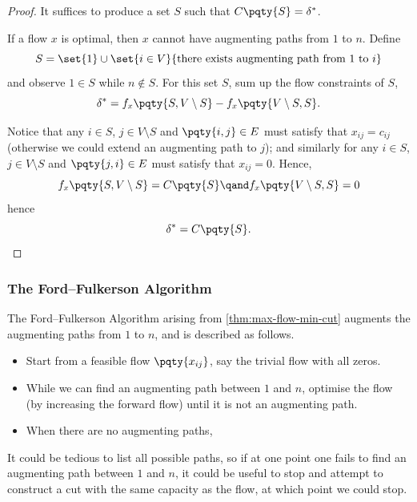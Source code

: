 \begin{proof}
    It suffices to produce a set \(S\) such that \(C\pqty{S} = \delta^{\ast}\).

    If a flow \(x\) is optimal, then \(x\) cannot have augmenting paths from \(1\) to \(n\). Define
    \[
        S = \set{1} \cup \set{i \in V}{\text{there exists augmenting path from }1\text{ to }i}
    \]
    and observe \(1 \in S\) while \(n \notin S\). For this set \(S\), sum up the flow constraints of \(S\),
    \[
        \delta^{\ast} = f_x \pqty{S, V \setminus S} - f_x \pqty{V \setminus S, S}.
    \]

    Notice that any \(i \in S\), \(j \in V \setminus S\) and \(\pqty{i, j} \in E\) must satisfy that \(x_{ij} = c_{ij}\) (otherwise we could extend an augmenting path to \(j\)); and similarly for any \(i \in S\), \(j \in V \setminus S\) and \(\pqty{j, i} \in E\) must satisfy that \(x_{ij} = 0\). Hence,
    \[
        f_x \pqty{S, V \setminus S} = C\pqty{S} \qand f_x \pqty{V \setminus S, S} = 0
    \]
    hence
    \[
        \delta^{\ast} = C\pqty{S}.
    \]
\end{proof}

\subsubsection{The Ford--Fulkerson Algorithm}

The Ford--Fulkerson Algorithm arising from \autoref{thm:max-flow-min-cut} augments the augmenting paths from \(1\) to \(n\), and is described as follows.

\begin{itemize}
    \item Start from a feasible flow \(\pqty{x_{ij}}\), say the trivial flow with all zeros.
    \item While we can find an augmenting path between \(1\) and \(n\), optimise the flow (by increasing the forward flow) until it is not an augmenting path.
    \item When there are no augmenting paths, 
\end{itemize}

It could be tedious to list all possible paths, so if at one point one fails to find an augmenting path between \(1\) and \(n\), it could be useful to stop and attempt to construct a cut with the same capacity as the flow, at which point we could stop.

